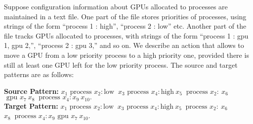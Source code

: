 \documentclass[12pt, a4paper]{article}
\begin{document}
\begin{example}\label{example:gpu}
Suppose configuration information about GPUs allocated to processes are maintained in a text file. One part of  the file stores priorities of processes, using strings of the form ``process 1 : high'', ``process 2 : low'' etc. Another part of the file tracks GPUs allocated to processes, with strings of the form ``process 1 : gpu 1, gpu 2,'', ``process 2 : gpu 3,'' and so on. We describe an action that allows to move a GPU from a low priority process to a high priority one, provided there is still at least one GPU left for the low priority process. The source and target patterns are as follows:\\

\noindent
\begin{flushright}
\textbf{Source Pattern:} $x_1 \text{ process }x_2:\text{low }~x_3 
	\text{ process }x_4:\mathrm{high}~x_5~\text{ process 
}x_2:~x_6 $ ~ $ \text{ gpu } x_7 ~x_8 ~\text{ process }x_4: x_9 ~ x_{10}.$\\
%
\textbf{Target Pattern:} $x_1 \text{ process }x_2:\text{low }~x_3 
\text{ process }x_4:\mathrm{high}~x_5~\text{ process 
}x_2:~x_6 $ ~ $ x_8 ~\text{ process }x_4: x_9  \text{ gpu } x_7 ~ x_{10}$.\\
\end{flushright}


\end{example}
\end{document}
